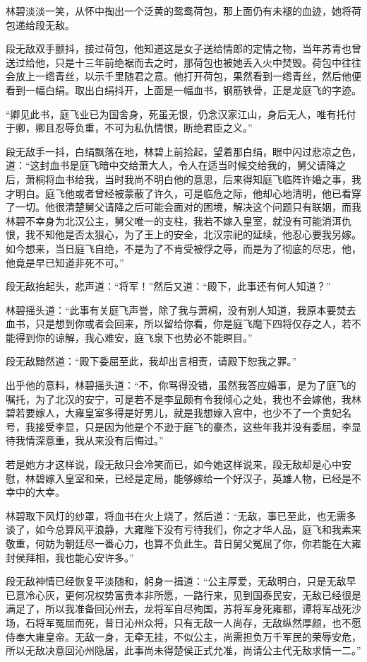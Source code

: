 林碧淡淡一笑，从怀中掏出一个泛黄的鸳鸯荷包，那上面仍有未褪的血迹，她将荷包递给段无敌。

段无敌双手颤抖，接过荷包，他知道这是女子送给情郎的定情之物，当年苏青也曾送过给他，只是十三年前绝裾而去之时，那荷包也被她丢入火中焚毁。荷包中往往会放上一绺青丝，以示千里随君之意。他打开荷包，果然看到一绺青丝，然后他便看到一幅白绢。取出白绢抖开，上面是一幅血书，钢筋铁骨，正是龙庭飞的字迹。

“卿见此书，庭飞业已为国舍身，死虽无恨，仍念汉家江山，身后无人，唯有托付于卿，卿且忍辱负重，不可为私仇情恨，断绝君臣之义。”

段无敌手一抖，白绢飘落在地，林碧上前拾起，望着那白绢，眼中闪过悲凉之色，道：“这封血书是庭飞暗中交给萧大人，令人在适当时候交给我的，舅父请降之后，萧桐将血书给我，当时我尚不明白他的意思，后来得知庭飞临阵许婚之事，我才明白。庭飞他或者曾经被蒙蔽了许久，可是临危之际，他却心地清明，他已看穿了一切。他很清楚舅父请降之后可能会面对的困境，解决这个问题只有联姻，而我林碧不幸身为北汉公主，舅父唯一的支柱，我若不嫁入皇室，就没有可能消洱仇恨，我不知他是否太狠心，为了王上的安全，北汉宗祀的延续，他忍心要我另嫁。如今想来，当日庭飞自绝，不是为了不肯受被俘之辱，而是为了彻底的尽忠，他，他竟是早已知道非死不可。”

段无敌抬起头，悲声道：“将军！”然后又道：“殿下，此事还有何人知道？”

林碧摇头道：“此事有关庭飞声誉，除了我与萧桐，没有别人知道，我原本要焚去血书，只是想到你或者会回来，所以留给你看，你是庭飞麾下四将仅存之人，若不能得到你的谅解，我心难安，庭飞泉下也势必不能瞑目。”

段无敌黯然道：“殿下委屈至此，我却出言相责，请殿下恕我之罪。”

出乎他的意料，林碧摇头道：“不，你骂得没错，虽然我答应婚事，是为了庭飞的嘱托，为了北汉的安宁，可是若不是李显颇有令我倾心之处，我也不会嫁他，我林碧若要嫁人，大雍皇室多得是好男儿，就是我想嫁入宫中，也少不了一个贵妃名号，我接受李显，只是因为他是个不逊于庭飞的豪杰，这些年我并没有委屈，李显待我情深意重，我从来没有后悔过。”

若是她方才这样说，段无敌只会冷笑而已，如今她这样说来，段无敌却是心中安慰，林碧嫁入皇室和亲，已经是定局，能够嫁给一个好汉子，英雄人物，已经是不幸中的大幸。

林碧取下风灯的纱罩，将血书在火上烧了，然后道：“无敌，事已至此，也无需多谈了，如今总算风平浪静，大雍陛下没有亏待我们，你之才华人品，庭飞和我素来敬重，何妨为朝廷尽一番心力，也算不负此生。昔日舅父冤屈了你，你若能在大雍封侯拜相，我也能心安许多。”

段无敌神情已经恢复平淡随和，躬身一揖道：“公主厚爱，无敌明白，只是无敌早已意冷心灰，更何况权势富贵本非所愿，一路行来，见到国泰民安，无敌已经很是满足了，所以我准备回沁州去，龙将军自尽殉国，苏将军身死雍都，谭将军战死沙场，石将军冤屈而死，昔日沁州众将，只有无敌一人尚存，无敌纵然厚颜，也不愿侍奉大雍皇帝。无敌一身，无牵无挂，不似公主，尚需担负万千军民的荣辱安危，所以无敌决意回沁州隐居，此事尚未得楚侯正式允准，尚请公主代无敌求情一二。”

